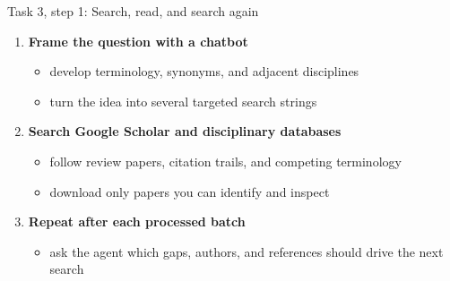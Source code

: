 \begin{frame}{Task 3, step 1: Search, read, and search again}
  \vfill
  \begin{enumerate}\setlength\itemsep{0.8em}
    \item \textbf{Frame the question with a chatbot}
      \begin{itemize}\small
        \item develop terminology, synonyms, and adjacent disciplines
        \item turn the idea into several targeted search strings
      \end{itemize}
    \item \textbf{Search Google Scholar and disciplinary databases}
      \begin{itemize}\small
        \item follow review papers, citation trails, and competing terminology
        \item download only papers you can identify and inspect
      \end{itemize}
    \item \textbf{Repeat after each processed batch}
      \begin{itemize}\small
        \item ask the agent which gaps, authors, and references should drive the next search
      \end{itemize}
  \end{enumerate}
  \vspace{1.0cm plus 1fill}
\end{frame}

